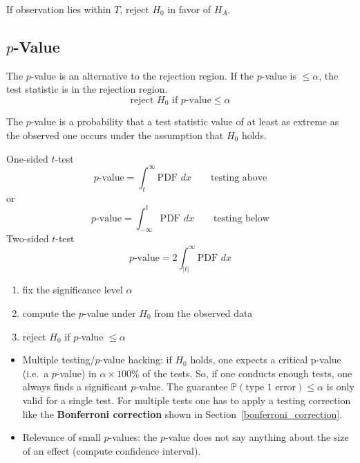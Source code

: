 \renewcommand{\arraystretch}{1}
\setlength\tabcolsep{\oldtabcolsep}

If observation lies within $T$, reject $H_0$ in favor of $H_A$.

\subsection[p-Value]{$p$-Value}
The $p$-value is an alternative to the rejection region. If the $p$-value is $\leq \alpha$, the test statistic is in the rejection region.
\begin{equation*}
    \text{reject } H_0 \text{ if } p\text{-value} \leq \alpha
\end{equation*}

The $p$-value is a probability that a test statistic value of at least as extreme as the observed one occurs under the assumption that $H_0$ holds.

One-sided $t$-test
\begin{equation*}
    p\text{-value} = \int_{t}^{\infty}\text{PDF }dx \qquad \text{testing above}
\end{equation*}
or
\begin{equation*}
    p\text{-value} = \int_{-\infty}^{t}\text{PDF }dx \qquad \text{testing below}
\end{equation*}
Two-sided $t$-test
\begin{equation*}
    p\text{-value} = 2\int_{|t|}^{\infty}\text{PDF }dx
\end{equation*}

\newpar{}
\begin{enumerate}
    \item fix the significance level $\alpha$
    \item compute the $p$-value under $H_0$ from the observed data
    \item reject $H_0$ if $p$-value $\leq \alpha$
\end{enumerate}

\newpar{}

\begin{itemize}
    \item Multiple testing/$p$-value hacking: if $H_0$ holds, one expects a critical p-value (i.e.\ a $p$-value) in $\alpha \times 100\%$ of the tests. So, if one conducts enough tests, one always finds a significant $p$-value. The guarantee $\mathbb{P}(\text{type 1 error}) \leq \alpha$ is only valid for a single test. For multiple tests one has to apply a testing correction like the \textbf{Bonferroni correction} shown in Section~\ref{bonferroni_correction}.
    \item Relevance of small $p$-values: the $p$-value does not say anything about the size of an effect (compute confidence interval).
\end{itemize}

